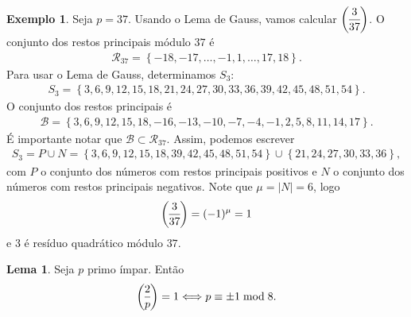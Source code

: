 \documentclass[a4paper,11pt,twoside, leqno]{article}
\newcommand{\genlegendre}[4]{%
	\genfrac{(}{)}{}{#1}{#3}{#4}%
	\if\relax\detokenize{#2}\relax\else_{\!#2}\fi
}
\newcommand{\legendre}[3][]{\genlegendre{}{#1}{#2}{#3}}
\theoremstyle{definition}
\newtheorem{lemma}[theorem]{Lema}
\newtheorem*{example}{Exemplo}
\begin{document}
\begin{example}
	Seja $p=37$. Usando o Lema de Gauss, vamos calcular $\displaystyle{\legendre[]{3}{37}}$. O conjunto dos restos principais módulo $37$ é
	\begin{align*}
	\mathcal{R}_{37} = \left\{ -18, -17, \dots, -1,1,\dots,17,18 \right\}.
	\end{align*}
	Para usar o Lema de Gauss, determinamos $S_3$:
	\begin{align*}
	S_3 = \left\{ 3,6,9,12,15,18,21,24,27,30,33,36,39,42,45,48,51,54 \right\}.
	\end{align*}
	O conjunto dos restos principais é
	\begin{align*}
	\mathcal{B} = \left\{ 3,6,9,12,15,18,-16,-13,-10,-7,-4,-1,2,5,8,11,14,17 \right\}.
	\end{align*}
	É importante notar que $\mathcal{B}\subset \mathcal{R}_{37}$. Assim, podemos escrever
	\begin{align*}
	S_3 = P\cup N = \left\{ 3,6,9,12,15,18,39,42,45,48,51,54 \right\}\cup\left\{ 21,24,27,30,33,36 \right\},
	\end{align*}
	com $P$ o conjunto dos números com restos principais positivos e $N$ o conjunto dos números com restos principais negativos. Note que $\mu = |N| = 6$, logo
	\begin{align*}
	\legendre[]{3}{37} = (-1)^{\mu} = 1
	\end{align*}
	e $3$ é resíduo quadrático módulo $37$.
\end{example}
\begin{lemma}
	\label{lema 90}
	Seja $p$ primo ímpar. Então
	\begin{align*}
	\legendre[]{2}{p} = 1 \Longleftrightarrow p\equiv \pm 1\bmod 8.
	\end{align*}
\end{lemma}
\end{document}
